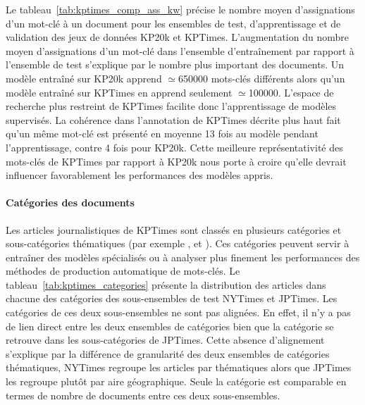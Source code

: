 Le tableau~\ref{tab:kptimes_comp_ass_kw} précise le nombre moyen d'assignations d'un mot-clé à un document pour les ensembles de test, d'apprentissage et de validation des jeux de données KP20k et KPTimes.
L'augmentation du nombre moyen d'assignations d'un mot-clé dans l'ensemble d'entraînement par rapport à l'ensemble de test s'explique par le nombre plus important des documents.
Un modèle entraîné sur KP20k apprend $\simeq$\num{650000} mots-clés différents alors qu'un modèle entraîné sur KPTimes en apprend seulement $\simeq$\num{100000}.
L'espace de recherche plus restreint de KPTimes facilite donc l'apprentissage de modèles supervisés.
La cohérence dans l'annotation de KPTimes décrite plus haut fait qu'un même mot-clé est présenté en moyenne 13 fois au modèle pendant l'apprentissage, contre 4 fois pour KP20k.
Cette meilleure représentativité des mots-clés de KPTimes par rapport à KP20k nous porte à croire qu'elle devrait influencer favorablement les performances des modèles appris. 



\paragraph{Catégories des documents}
Les articles journalistiques de KPTimes sont classés en plusieurs catégories et sous-catégories thématiques (par exemple ,  et ).
Ces catégories peuvent servir à entraîner des modèles spécialisés ou à analyser plus finement les performances des méthodes de production automatique de mots-clés.
Le tableau~\ref{tab:kptimes_categories} présente la distribution des articles dans chacune des catégories des sous-ensembles de test NYTimes et JPTimes.
Les catégories de ces deux sous-ensembles ne sont pas alignées. En effet, il n'y a pas de lien direct entre les deux ensembles de catégories bien que la catégorie  se retrouve dans les sous-catégories de JPTimes.
Cette absence d'alignement s'explique par la différence de granularité des deux ensembles de catégories thématiques, NYTimes regroupe les articles par thématiques alors que JPTimes les regroupe plutôt par aire géographique. Seule la catégorie  est comparable en termes de nombre de documents entre ces deux sous-ensembles.






